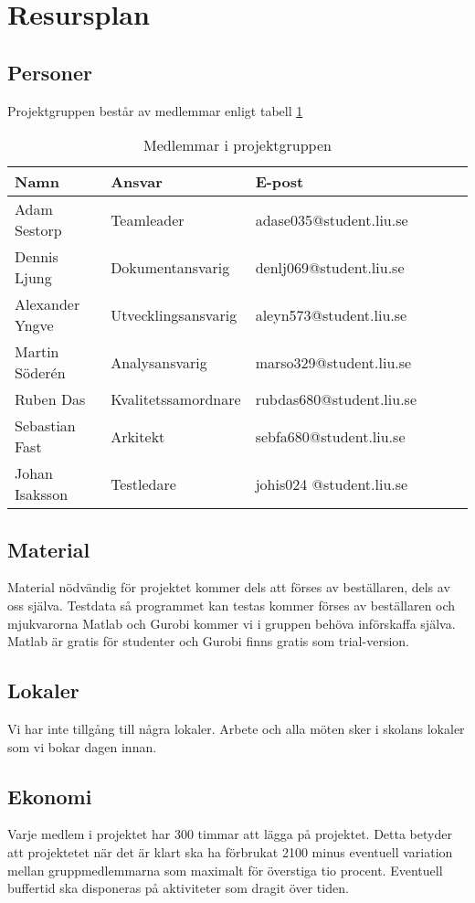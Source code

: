 \section{Resursplan}

\subsection{Personer}
Projektgruppen består av medlemmar enligt tabell \ref{projektplan:resursplan-personer}
\begin{table}[h]
	\centering
		\begin{tabularx}{\textwidth}{| l | l | X | l | l | l |}
			\hline
			\textbf{Namn} & \textbf{Ansvar} & \textbf{E-post} \\
			\hline
			{Adam Sestorp} & {Teamleader} & {adase035@student.liu.se} \\\hline
			{Dennis Ljung} & {Dokumentansvarig} & {denlj069@student.liu.se} \\\hline
			{Alexander Yngve} & {Utvecklingsansvarig} & {aleyn573@student.liu.se} \\\hline
			{Martin Söderén} & {Analysansvarig} & {marso329@student.liu.se} \\\hline
			{Ruben Das} & {Kvalitetssamordnare} & {rubdas680@student.liu.se} \\\hline
			{Sebastian Fast} & {Arkitekt} & {sebfa680@student.liu.se} \\\hline
			{Johan Isaksson } & {Testledare} & {johis024	@student.liu.se} \\\hline
		\end{tabularx}
	\caption{Medlemmar i projektgruppen} \label{projektplan:resursplan-personer}
\end{table}

\subsection{Material}
Material nödvändig för projektet kommer dels att förses av beställaren, dels av oss själva. Testdata så programmet kan testas kommer förses av beställaren och mjukvarorna Matlab och Gurobi kommer vi i gruppen behöva införskaffa själva. Matlab är gratis för studenter och Gurobi finns gratis som trial-version.  

\subsection{Lokaler}
Vi har inte tillgång till några lokaler. Arbete och alla möten sker i skolans lokaler som vi bokar dagen innan. 

\subsection{Ekonomi}
Varje medlem i projektet har 300 timmar att lägga på projektet. Detta betyder att projektetet när det är klart ska ha förbrukat 2100 minus eventuell variation mellan gruppmedlemmarna som maximalt för överstiga tio procent. Eventuell buffertid ska disponeras på aktiviteter som dragit över tiden. 